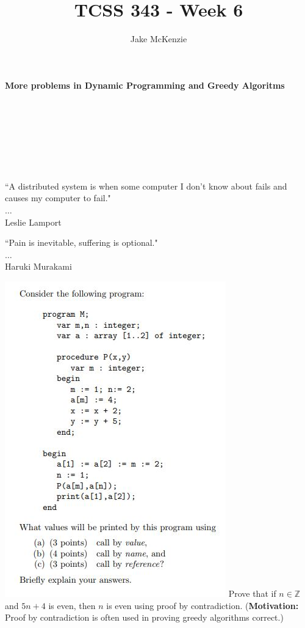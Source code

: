 \documentclass[12pt]{article}
\begin{document}
\title{TCSS 343 - Week 6}
\author{Jake McKenzie}
\maketitle
\noindent\centerline{\textbf{More problems in Dynamic Programming and Greedy Algoritms}}\\\\\\\\\\\\
\begin{center}
    ``A distributed system is when some computer I don't know about fails and causes my computer to fail." \\$\dots$\\ Leslie Lamport
\end{center}
\begin{center}
    ``Pain is inevitable, suffering is optional." \\$\dots$\\ Haruki Murakami
\end{center}
\newpage
\noindent\includegraphics[scale = 1]{debugging.JPG}
\newpage
\noindent Prove that if $n \in \mathbb{Z}$ and $5n+4$ is even, then $n$ is even using proof by contradiction.
(\textbf{Motivation: }Proof by contradiction is often used in proving greedy algorithms correct.)
\end{document}
